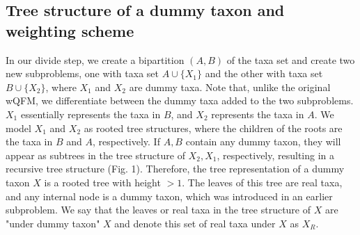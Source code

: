\documentclass[11pt]{article}
\begin{document}
\subsection*{Tree structure of a dummy taxon and weighting scheme}

In our divide step, we create a bipartition $(A, B)$ of the taxa set and create two new subproblems, one with taxa set $A \cup \{X_1\}$ and the other with taxa set $B \cup \{X_2\}$, where $X_1$ and $X_2$ are dummy taxa. Note that, unlike the original wQFM, we differentiate between the dummy taxa added to the two subproblems. $X_1$ essentially represents the taxa in $B$, and $X_2$ represents the taxa in $A$. We model $X_1$ and $X_2$ as rooted tree structures, where the children of the roots are the taxa in $B$ and $A$, respectively. If $A, B$ contain any dummy taxon, they will appear as subtrees in the tree structure of $X_2, X_1$, respectively, resulting in a recursive tree structure (Fig. 1). Therefore, the tree representation of a dummy taxon $X$ is a rooted tree with height $>1$. The leaves of this tree are real taxa, and any internal node is a dummy taxon, which was introduced in an earlier subproblem. We say that the leaves or real taxa in the tree structure of $X$ are "under dummy taxon" $X$ and denote this set of real taxa under $X$ as $X_R$.
\end{document}
